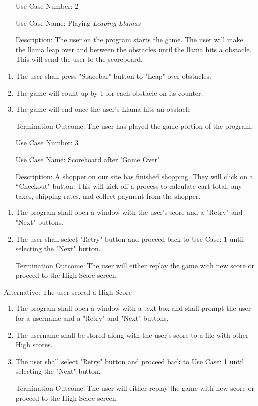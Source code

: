 \documentclass[10pt,conference,onecolumn,compsoc]{IEEEtran}
\begin{document}
\begin{itemize}
\item[Use Case Number:] 2
\item[Use Case Name:] Playing \textit{Leaping Llamas}
\item[Description:] The user on the program starts the game. The user will make the llama leap over and between the obstacles until the llama hits a obstacle. This will send the user to the scoreboard.
\end{itemize}

\begin{enumerate}
\item The user shall press "Spacebar" button to "Leap" over obstacles.
\item The game will count up by 1 for each obstacle on its counter.
\item The game will end once the user's Llama hits an obstacle
\item[Termination Outcome:] The user has played the game portion of the program.
\end{enumerate}


\begin{itemize}
\item[Use Case Number:] 3
\item[Use Case Name:] Scoreboard after 'Game Over'
\item[Description:] A shopper on our site has finished shopping.  They will click on a ``Checkout" button.  This will kick off a process to calculate cart total, any taxes, shipping rates, and collect payment from the shopper.

\end{itemize}

\begin{enumerate}
\item The program shall open a window with the user's score and a "Retry" and "Next" buttons.
\item The user shall select "Retry" button and proceed back to Use Case: 1 until selecting the "Next" button.
\item[Termination Outcome:] The user will either replay the game with new score or proceed to the High Score screen.
\end{enumerate}

Alternative: The user scored a High Score
\begin{enumerate}
\item The program shall open a window with a text box and shall prompt the user for a username and a "Retry" and "Next" buttons.
\item The username shall be stored along with the user's score to a file with other High scores.
\item The user shall select "Retry" button and proceed back to Use Case: 1 until selecting the "Next" button.
\item[Termination Outcome:] The user will either replay the game with new score or proceed to the High Score screen.
\end{enumerate}
\end{document}
